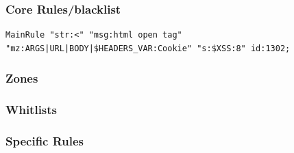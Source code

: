 \documentclass[Naxsi]{subfiles}
\begin{document}
\subsubsection*{Core Rules/blacklist}

\begin{verbatim}
MainRule "str:<" "msg:html open tag" "mz:ARGS|URL|BODY|$HEADERS_VAR:Cookie" "s:$XSS:8" id:1302; 
\end{verbatim}

\subsubsection*{Zones}

\subsubsection*{Whitlists}

\subsubsection*{Specific Rules}
\end{document}
